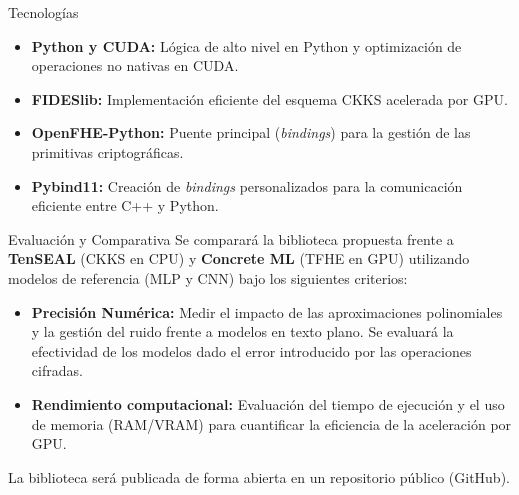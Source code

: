 \begin{frame}{Tecnologías}
    \begin{itemize}
        \setlength{\itemsep}{10pt}
        \item \textbf{Python y CUDA:} Lógica de alto nivel en Python y optimización de operaciones no nativas en CUDA.
        \item \textbf{FIDESlib:} Implementación eficiente del esquema CKKS acelerada por GPU.
        \item \textbf{OpenFHE-Python:} Puente principal (\textit{bindings}) para la gestión de las primitivas criptográficas.
        \item \textbf{Pybind11:} Creación de \textit{bindings} personalizados para la comunicación eficiente entre C++ y Python.
    \end{itemize}
\end{frame}

\begin{frame}{Evaluación y Comparativa}
    Se comparará la biblioteca propuesta frente a \textbf{TenSEAL} (CKKS en CPU) y \textbf{Concrete ML} (TFHE en GPU) utilizando modelos de referencia (MLP y CNN) bajo los siguientes criterios:
    \vspace{0.3cm}
    \begin{itemize}
        \setlength{\itemsep}{12pt}
        \item \textbf{Precisión Numérica:} Medir el impacto de las aproximaciones polinomiales y la gestión del ruido frente a modelos en texto plano. Se evaluará la efectividad de los modelos dado el error introducido por las operaciones cifradas.
        \item \textbf{Rendimiento computacional:} Evaluación del tiempo de ejecución y el uso de memoria (RAM/VRAM) para cuantificar la eficiencia de la aceleración por GPU.
    \end{itemize}
    \vfill
    \begin{center}
        \small La biblioteca será publicada de forma abierta en un repositorio público (GitHub).
    \end{center}
\end{frame}
